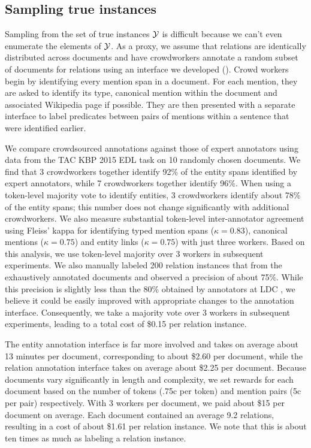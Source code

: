 \subsection{Sampling true instances}
Sampling from the set of true instances $\mathcal{Y}$ is difficult because we can't even enumerate the elements of $\mathcal{Y}$.
As a proxy, we assume that relations are identically distributed across documents and have crowdworkers annotate a random subset of documents for relations using an interface we developed ().
Crowd workers begin by identifying every mention span in a document.
  For each mention, they are asked to identify its type, canonical mention within the document
  and associated Wikipedia page if possible.
They are then presented with a separate interface to label predicates between pairs of mentions within a sentence that were identified earlier.

We compare crowdsourced annotations against those of expert annotators using data from the TAC KBP 2015 EDL task on 10 randomly chosen documents.
We find that 3 crowdworkers together identify 92\% of the entity spans identified by expert annotators, while 7 crowdworkers together identify 96\%.
When using a token-level majority vote to identify entities, 3 crowdworkers identify about 78\% of the entity spans; this number does not change significantly with additional crowdworkers.
We also measure substantial token-level inter-annotator agreement using Fleiss' kappa for identifying typed mention spans ($\kappa = 0.83$), canonical mentions ($\kappa = 0.75$) and entity links ($\kappa = 0.75$) with just three workers.
Based on this analysis, we use token-level majority over 3 workers in subsequent experiments.
We also manually labeled 200 relation instances that from the exhaustively annotated documents and observed a precision of about 75\%.
While this precision is slightly less than the 80\% obtained by annotators at LDC \citep{ellis2016overview}, we believe it could be easily improved with appropriate changes to the annotation interface.
Consequently, we take a majority vote over 3 workers in subsequent experiments,
leading to a total cost of \$0.15 per relation instance.

The entity annotation interface is far more involved and takes on average about 13 minutes per document, corresponding to about \$2.60 per document, while the relation annotation interface takes on average about \$2.25 per document.
Because documents vary significantly in length and complexity, we set rewards for each document based on the number of tokens (.75c per token) and mention pairs (5c per pair) respectively.
With 3 workers per document, we paid about \$15 per document on average.
Each document contained an average 9.2 relations, resulting in a cost of about \$1.61 per relation instance.
We note that this is about ten times as much as labeling a relation instance.

